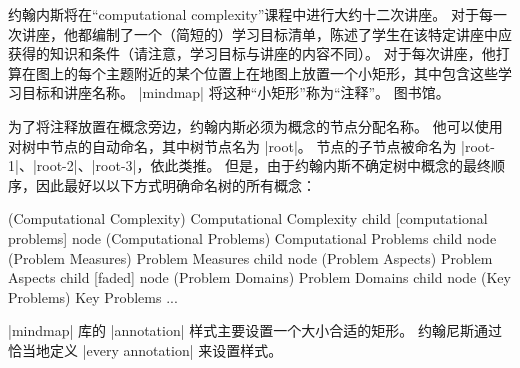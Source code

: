 约翰内斯将在``computational complexity''课程中进行大约十二次讲座。 对于每一次讲座，他都编制了一个（简短的）学习目标清单，陈述了学生在该特定讲座中应获得的知识和条件（请注意，学习目标与讲座的内容不同）。 对于每次讲座，他打算在图上的每个主题附近的某个位置上在地图上放置一个小矩形，其中包含这些学习目标和讲座名称。  |mindmap| 将这种``小矩形''称为``注释''。 图书馆。


为了将注释放置在概念旁边，约翰内斯必须为概念的节点分配名称。 他可以使用\tikzname 对树中节点的自动命名，其中树节点名为 |root|。 节点的子节点被命名为 |root-1|、|root-2|、|root-3|，依此类推。 但是，由于约翰内斯不确定树中概念的最终顺序，因此最好以以下方式明确命名树的所有概念：

%
\begin{codeexample}
 (Computational Complexity) {Computational Complexity}
  child [computational problems] { node (Computational Problems) {Computational Problems}
    child         { node (Problem Measures) {Problem Measures} }
    child         { node (Problem Aspects) {Problem Aspects} }
    child [faded] { node (Problem Domains) {Problem Domains} }
    child         { node (Key Problems) {Key Problems} }
  }
...
\end{codeexample}


|mindmap| 库的 |annotation| 样式主要设置一个大小合适的矩形。 约翰尼斯通过恰当地定义 |every annotation| 来设置样式。 

